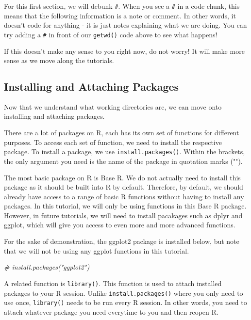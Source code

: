 \documentclass[
]{book}
\newenvironment{Shaded}{\begin{snugshade}}{\end{snugshade}}
\newcommand{\CommentTok}[1]{\textcolor[rgb]{0.56,0.35,0.01}{\textit{#1}}}
\begin{document}
For this first section, we will debunk \texttt{\#}. When you see a \texttt{\#} in a code chunk, this means that the following information is a note or comment. In other words, it doesn't code for anything - it is just notes explaining what we are doing. You can try adding a \texttt{\#} in front of our \texttt{getwd()} code above to see what happens!

If this doesn't make any sense to you right now, do not worry! It will make more sense as we move along the tutorials.

\hypertarget{installing-and-attaching-packages}{%
\subsection{Installing and Attaching Packages}\label{installing-and-attaching-packages}}

Now that we understand what working directories are, we can move onto installing and attaching packages.

There are a lot of packages on R, each has its own set of functions for different purposes. To access each set of function, we need to install the respective package. To install a package, we use \texttt{install.packages()}. Within the brackets, the only argument you need is the name of the package in quotation marks ("").

The most basic package on R is Base R. We do not actually need to install this package as it should be built into R by default. Therefore, by default, we should already have access to a range of basic R functions without having to install any packages. In this tutorial, we will only be using functions in this Base R package. However, in future tutorials, we will need to install pacakages such as dplyr and ggplot, which will give you access to even more and more advanced functions.

For the sake of demonstration, the ggplot2 package is installed below, but note that we will not be using any ggplot functions in this tutorial.

\begin{Shaded}
\begin{Highlighting}[]
\CommentTok{\# install.packages("ggplot2")}
\end{Highlighting}
\end{Shaded}

A related function is \texttt{library()}. This function is used to attach installed packages to your R session. Unlike \texttt{install.packages()} where you only need to use once, \texttt{library()} needs to be run every R session. In other words, you need to attach whatever package you need everytime to you and then reopen R.
\end{document}
